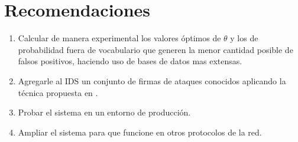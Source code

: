 \section{Recomendaciones}

\begin{enumerate}
\item Calcular de manera experimental los valores óptimos de $\theta$ y los de probabilidad fuera de vocabulario que generen la menor cantidad posible de falsos positivos, haciendo uso de bases de datos mas extensas.
\item Agregarle al IDS un conjunto de firmas de ataques conocidos aplicando la técnica propuesta en \cite{firmas}.
\item Probar el sistema en un entorno de producción.
\item Ampliar el sistema para que funcione en otros protocolos de la red.
\end{enumerate}
